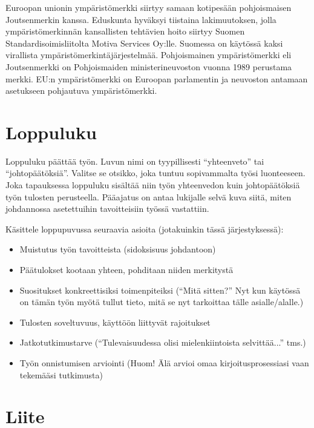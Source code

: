 Euroopan unionin ympäristömerkki siirtyy samaan kotipesään
pohjoismaisen Joutsenmerkin kanssa. Eduskunta hyväksyi tiistaina
lakimuutoksen, jolla ympäristömerkinnän kansallisten tehtävien hoito
siirtyy Suomen Standardisoimisliitolta Motiva Services Oy:lle.
Suomessa on käytössä kaksi virallista
ympäristömerkintäjärjestelmää. Pohjoismainen ympäristömerkki eli
Joutsenmerkki on Pohjoismaiden ministerineuvoston vuonna 1989
perustama merkki. EU:n ympäristömerkki on Euroopan parlamentin ja
neuvoston antamaan asetukseen pohjautuva ympäristömerkki.


\section{Loppuluku}

Loppuluku päättää työn. Luvun nimi on tyypillisesti ``yhteenveto'' tai
``johtopäätöksiä''. Valitse se otsikko, joka tuntuu sopivammalta työsi
luonteeseen. Joka tapauksessa loppuluku sisältää niin työn yhteenvedon
kuin johtopäätöksiä työn tulosten perusteella. Pääajatus on antaa
lukijalle selvä kuva siitä, miten johdannossa asetettuihin
tavoitteisiin työssä vastattiin.

Käsittele loppupuvussa seuraavia asioita (jotakuinkin tässä järjestyksessä):
%
\begin{itemize}
  \item Muistutus työn tavoitteista (sidoksisuus johdantoon)
  \item Päätulokset kootaan yhteen, pohditaan niiden merkitystä
  \item Suositukset konkreettisiksi toimenpiteiksi (``Mitä sitten?'' 
Nyt kun käytössä on tämän työn myötä tullut tieto, 
mitä se nyt tarkoittaa tälle asialle/alalle.)
  \item Tulosten soveltuvuus, käyttöön liittyvät rajoitukset
  \item Jatkotutkimustarve 
(``Tulevaisuudessa olisi mielenkiintoista selvittää...'' tms.)
  \item Työn onnistumisen arviointi 
(Huom! Älä arvioi omaa kirjoitusprosessiasi vaan tekemääsi tutkimusta)
\end{itemize}


\section{Liite}

